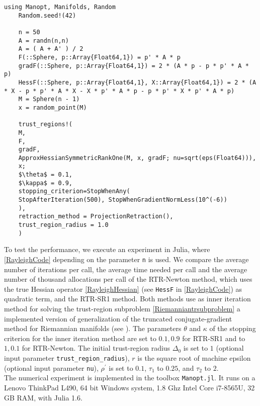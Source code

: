 \newpage

\begin{lstlisting}[mathescape, caption={The Rayleigh quotient minimization experiment in Julia for $n = 500$.}, label={RayleighCode}]
    using Manopt, Manifolds, Random
    Random.seed!(42)

    n = 50
    A = randn(n,n)
    A = ( A + A' ) / 2
    F(::Sphere, p::Array{Float64,1}) = p' * A * p
    gradF(::Sphere, p::Array{Float64,1}) = 2 * (A * p - p * p' * A * p)
    HessF(::Sphere, p::Array{Float64,1}, X::Array{Float64,1}) = 2 * (A * X - p * p' * A * X - X * p' * A * p - p * p' * X * p' * A * p)
    M = Sphere(n - 1)
    x = random_point(M)

    trust_regions!(
    M,
    F,
    gradF,
    ApproxHessianSymmetricRankOne(M, x, gradF; nu=sqrt(eps(Float64))),
    x;
    $\theta$ = 0.1,
    $\kappa$ = 0.9,
    stopping_criterion=StopWhenAny(
    StopAfterIteration(500), StopWhenGradientNormLess(10^(-6))
    ),
    retraction_method = ProjectionRetraction(),
    trust_region_radius = 1.0
    )
\end{lstlisting}
To test the performance, we execute an experiment in Julia, where \cref{RayleighCode} depending on the parameter \lstinline!n! is used. We compare the average number of iterations per call, the average time needed per call and the average number of thousand allocations per call of the RTR-Newton method, which uses the true Hessian operator \cref{RayleighHessian} (see \lstinline!HessF! in \cref{RayleighCode}) as quadratic term, and the RTR-SR1 method. Both methods use as inner iteration method for solving the trust-region subproblem \cref{Riemanniantrsubproblem} a implemented version of generalization of the truncated conjugate-gradient method for Riemannian manifolds (see \cite[Algorithm~11]{AbsilMahonySepulchre:2008}). The parameters $\theta$ and $\kappa$ of the stopping criterion \cite[(7.10)]{AbsilMahonySepulchre:2008} for the inner iteration method are set to $0.1, 0.9$ for RTR-SR1 and to $1, 0.1$ for RTR-Newton. The initial trust-region radius $\Delta_0$ is set to $1$ (optional input parameter \lstinline!trust_region_radius!), $r$ is the square root of machine epsilon (optional input parameter \lstinline!nu!), $\rho^{\prime}$ is set to $0.1$, $\tau_1$ to $0.25$, and $\tau_2$ to $2$. \\
The numerical experiment is implemented in the toolbox \lstinline!Manopt.jl!. It runs on a Lenovo ThinkPad L490, 64 bit Windows system, 1.8 Ghz Intel Core i7-8565U, 32 GB RAM, with Julia 1.6.
